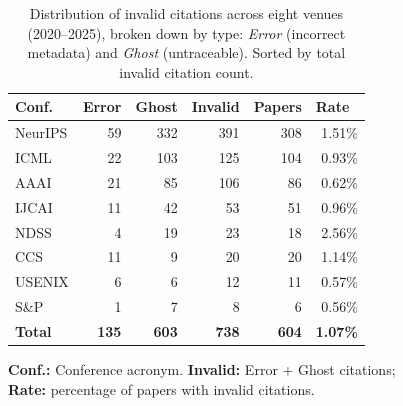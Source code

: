 \begin{table}[t]
  \centering
  \begin{threeparttable}
    \caption{Distribution of invalid citations across eight venues (2020--2025), broken down by type: \textit{Error} (incorrect metadata) and \textit{Ghost} (untraceable). Sorted by total invalid citation count.}
    \label{tab:invalid_by_venue}
    \small
{}
\begin{tabular}{lrrrrr}
\toprule
\multicolumn{1}{l}{\textbf{Conf.}} & \multicolumn{1}{l}{\textbf{Error}} & \multicolumn{1}{l}{\textbf{Ghost}} & \multicolumn{1}{l}{\textbf{Invalid}} & \multicolumn{1}{l}{\textbf{Papers}} & \multicolumn{1}{l}{\cellcolor{red!20}\textbf{Rate}} \\
\midrule
NeurIPS & 59 & 332 & 391 & 308 & \cellcolor{red!35}1.51\% \\
ICML & 22 & 103 & 125 & 104 & \cellcolor{red!25}0.93\% \\
AAAI & 21 & 85 & 106 & 86 & \cellcolor{red!22}0.62\% \\
IJCAI & 11 & 42 & 53 & 51 & \cellcolor{red!23}0.96\% \\
\midrule
NDSS & 4 & 19 & 23 & 18 & \cellcolor{red!33}2.56\% \\
CCS & 11 & 9 & 20 & 20 & \cellcolor{red!25}1.14\% \\
USENIX & 6 & 6 & 12 & 11 & \cellcolor{red!20}0.57\% \\
S\&P & 1 & 7 & 8 & 6 & \cellcolor{red!22}0.56\% \\
\midrule
\textbf{Total} & \textbf{135} & \textbf{603} & \textbf{738} & \textbf{604} & \cellcolor{red!30}\textbf{1.07\%} \\
\bottomrule
\end{tabular}
    \begin{tablenotes}
      \footnotesize
      \item \textbf{Conf.:} Conference acronym.
\textbf{Invalid:} Error + Ghost citations;\\
\colorbox{red!22}{\textbf{Rate:}} percentage of papers with invalid citations.
    \end{tablenotes}
  \end{threeparttable}
\end{table}

